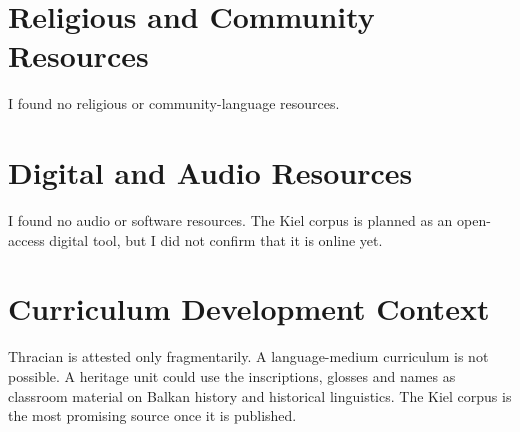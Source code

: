 \documentclass[12pt]{article}
\begin{document}
\section{Religious and Community Resources}
I found no religious or community-language resources.

\section{Digital and Audio Resources}
I found no audio or software resources. The Kiel corpus is planned as an open-access digital tool, but I did not confirm that it is online yet.

\section{Curriculum Development Context}
Thracian is attested only fragmentarily. A language-medium curriculum is not possible. A heritage unit could use the inscriptions, glosses and names as classroom material on Balkan history and historical linguistics. The Kiel corpus is the most promising source once it is published.
\end{document}
